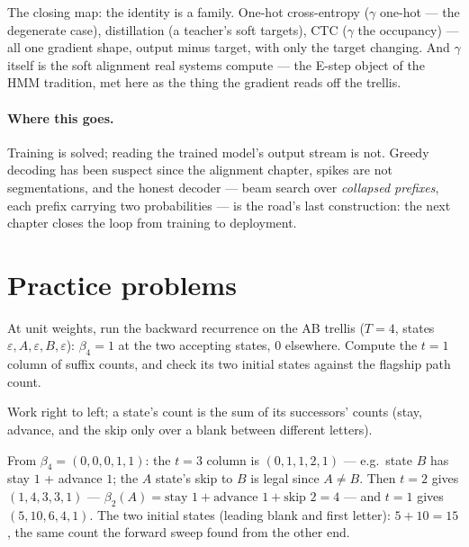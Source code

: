 \begin{narrative}
The closing map: the identity is a family. One-hot cross-entropy
($\gamma$ one-hot — the degenerate case), distillation (a teacher's
soft targets), CTC ($\gamma$ the occupancy) — all one gradient
shape, output minus target, with only the target changing. And
$\gamma$ itself is the soft alignment real systems compute — the
E-step object of the HMM tradition, met here as the thing the
gradient reads off the trellis.

\paragraph{Where this goes.} Training is solved; reading the trained
model's output stream is not. Greedy decoding has been suspect since
the alignment chapter, spikes are not segmentations, and the honest
decoder — beam search over \emph{collapsed prefixes}, each prefix
carrying two probabilities — is the road's last construction: the
next chapter closes the loop from training to deployment.
\end{narrative}

\section*{Practice problems}

\begin{problem}
At unit weights, run the backward recurrence on the AB trellis
($T = 4$, states $\varepsilon, A, \varepsilon, B, \varepsilon$):
$\beta_4 = 1$ at the two accepting states, $0$ elsewhere. Compute
the $t = 1$ column of suffix counts, and check its two initial
states against the flagship path count.
\begin{hint}
Work right to left; a state's count is the sum of its successors'
counts (stay, advance, and the skip only over a blank between
different letters).
\end{hint}
\begin{solution}
From $\beta_4 = (0, 0, 0, 1, 1)$: the $t = 3$ column is
$(0, 1, 1, 2, 1)$ — e.g.\ state $B$ has stay $1$ + advance $1$; the
$A$ state's skip to $B$ is legal since $A \neq B$. Then $t = 2$
gives $(1, 4, 3, 3, 1)$ — $\beta_2(A) = \text{stay } 1 +
\text{advance } 1 + \text{skip } 2 = 4$ — and $t = 1$ gives
$(5, 10, 6, 4, 1)$. The two initial states (leading blank and first
letter): $5 + 10 = 15$, the same count the forward sweep found from
the other end.
\end{solution}
\end{problem}

